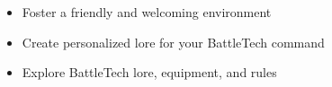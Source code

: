 \begin{itemize}

\item Foster a friendly and welcoming environment

\item Create personalized lore for your BattleTech command

\item Explore BattleTech lore, equipment, and rules

\end{itemize}
